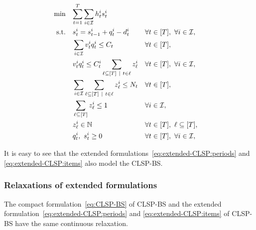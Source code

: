 \begin{subequations}\label{eq:extended-CLSP:items}
  \begin{align}
    \min\quad & \rlap{$\ds \sum_{t=1}^{\horizon} \sum_{i\in\REF} \holding_t^i \inventory_t^i$}
    \label{eq:extended-CLSP:items:objective}
    \\
    \st\quad & \ds \inventory_t^i = \inventory_{t-1}^i + \quantity_t^i - \demand_t^i && \forall t\in\range{\horizon},\ \forall i\in\REF,
    \label{eq:extended-CLSP:items:inventory-dynamic}
    \\
    & \ds \sum_{i\in\REF} \rate_t^i \quantity_t^i \le \capacity_t && \forall t\in\range{\horizon},
    \label{eq:extended-CLSP:items:capacity}
    \\
    & \ds \rate_t^i \quantity_t^i \le \capacity_t^i \sum_{\ell\subseteq{\range{\horizon}}~|~t\in\ell} z_{\ell}^i && \forall t\in\range{\horizon},\ \forall i\in\REF,
    \label{eq:extended-CLSP:items:item-capacity}
    \\
    & \ds \sum_{i\in\REF} \sum_{\ell\subseteq\range{\horizon}~|~t\in\ell} z_{\ell}^i \le \nbsetups_t && \forall t\in\range{\horizon},
    \label{eq:extended-CLSP:items:setups}
    \\
    & \ds \sum_{\ell\subseteq\range{\horizon}} z_{\ell}^i \le 1 && \forall i\in\REF,
    \label{eq:extended-CLSP:items:unique-pattern}
    \\
    & \ds z_{\ell}^i \in \NN && \forall t\in\range{\horizon},\ \ell\subseteq\range{\horizon},
    \label{eq:extended-CLSP:items:pattern}
    \\
    & \ds \quantity_t^i,\ \inventory_t^i \ge 0 && \forall t\in\range{\horizon},\ \forall i\in\REF,
    \label{eq:extended-CLSP:items:positivity}
  \end{align}
\end{subequations}


It is easy to see that the extended formulations~\eqref{eq:extended-CLSP:periods} and \eqref{eq:extended-CLSP:items} also model the CLSP-BS.



\subsubsection{Relaxations of extended formulations}



\begin{prop}\label{prop:extended-relaxation}
The compact formulation~\eqref{eq:CLSP-BS} of CLSP-BS and the extended formulation~\eqref{eq:extended-CLSP:periods} and \eqref{eq:extended-CLSP:items} of CLSP-BS have the same continuous relaxation.
\end{prop}


